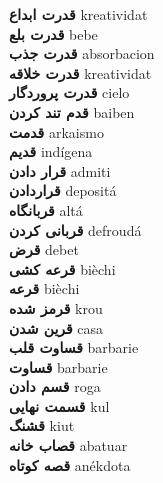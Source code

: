 \textbf{ قدرت ابداع  } kreatividat \\
\textbf{ قدرت بلع  } bebe \\
\textbf{ قدرت جذب  } absorbacion \\
\textbf{ قدرت خلاقه  } kreatividat \\
\textbf{ قدرت پروردگار  } cielo \\
\textbf{ قدم تند کردن  } baiben \\
\textbf{ قدمت  } arkaismo \\
\textbf{ قدیم  } indígena \\
\textbf{ قرار دادن  } admiti \\
\textbf{ قراردادن  } depositá \\
\textbf{ قربانگاه  } altá \\
\textbf{ قربانی کردن  } defroudá \\
\textbf{ قرض  } debet \\
\textbf{ قرعه کشی  } bièchi \\
\textbf{ قرعه  } bièchi \\
\textbf{ قرمز شده  } krou \\
\textbf{ قرین شدن  } casa \\
\textbf{ قساوت قلب  } barbarie \\
\textbf{ قساوت  } barbarie \\
\textbf{ قسم دادن  } roga \\
\textbf{ قسمت نهایی  } kul \\
\textbf{ قشنگ  } kiut \\
\textbf{ قصاب خانه  } abatuar \\
\textbf{ قصه کوتاه  } anékdota \\
